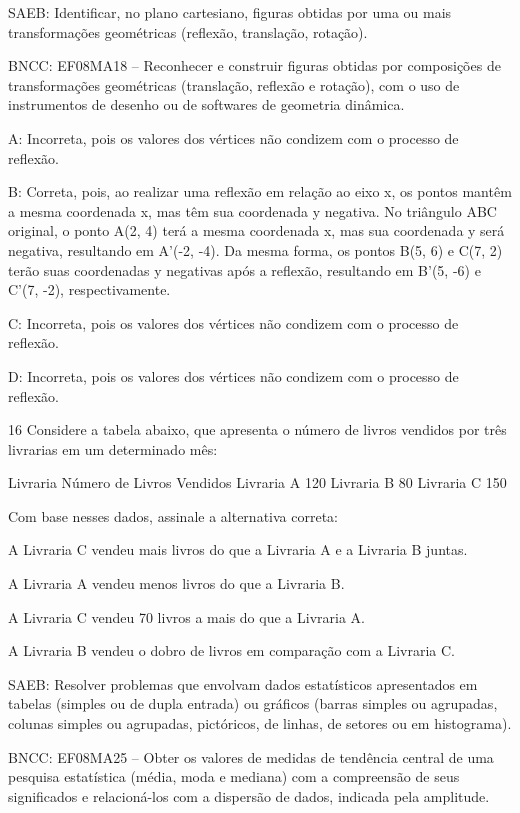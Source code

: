 {SAEB: Identificar, no plano cartesiano, figuras obtidas por uma ou mais
transformações geométricas (reflexão, translação, rotação).

BNCC: EF08MA18 -- Reconhecer e construir figuras obtidas por composições
de transformações geométricas (translação, reflexão e rotação), com o
uso de instrumentos de desenho ou de softwares de geometria dinâmica.

A: Incorreta, pois os valores dos vértices não condizem com o processo
de reflexão.

B: Correta, pois, ao realizar uma reflexão em relação ao eixo x, os
pontos mantêm a mesma coordenada x, mas têm sua coordenada y negativa.
No triângulo ABC original, o ponto A(2, 4) terá a mesma coordenada x,
mas sua coordenada y será negativa, resultando em A'(-2, -4). Da mesma
forma, os pontos B(5, 6) e C(7, 2) terão suas coordenadas y negativas
após a reflexão, resultando em B'(5, -6) e C'(7, -2), respectivamente.

C: Incorreta, pois os valores dos vértices não condizem com o processo
de reflexão.

D: Incorreta, pois os valores dos vértices não condizem com o processo
de reflexão.

\num{16} Considere a tabela abaixo, que apresenta o número de livros vendidos
por três livrarias em um determinado mês:


Livraria Número de Livros Vendidos Livraria A 120 Livraria B 80 Livraria
C 150

Com base nesses dados, assinale a alternativa correta:
\item A Livraria C vendeu mais livros do que a Livraria A e a Livraria B
juntas.
\item A Livraria A vendeu menos livros do que a Livraria B.
\item A Livraria C vendeu 70 livros a mais do que a Livraria A.
\item A Livraria B vendeu o dobro de livros em comparação com a Livraria C.

SAEB: Resolver problemas que envolvam dados estatísticos apresentados em
tabelas (simples ou de dupla entrada) ou gráficos (barras simples ou
agrupadas, colunas simples ou agrupadas, pictóricos, de linhas, de
setores ou em histograma).

BNCC: EF08MA25 -- Obter os valores de medidas de tendência central de
uma pesquisa estatística (média, moda e mediana) com a compreensão de
seus significados e relacioná-los com a dispersão de dados, indicada
pela amplitude.

}
